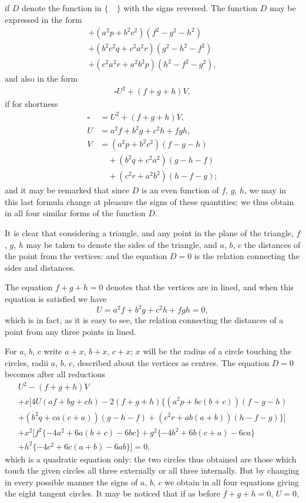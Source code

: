 \documentclass[11pt,a4paper]{book}
\begin{document}
\setcounter{page}{511}

if $D$ denote the function in $\{\quad\}$ with the signs reversed. The function $D$ may be expressed in the form
\begin{multline*}
+ (a^2p + b^2c^2)(f^2 - g^2 - h^2)\\
+ (b^2c^2q + c^2a^2r)(g^2 - h^2 - f^2)\\
+ (c^2a^2r + a^2b^2p)(h^2 - f^2 - g^2),
\end{multline*}
and also in the form
\begin{multline*}
\square U^2 + (f+g+h)V,
\end{multline*}
if for shortness
\begin{align*}
\square &= U^2 + (f+g+h)V,\\
U &= a^2f + b^2g + c^2h + fgh,\\
V &= (a^2p + b^2c^2)(f-g-h)\\
&\quad + (b^2q + c^2a^2)(g-h-f)\\
&\quad + (c^2r + a^2b^2)(h-f-g);
\end{align*}
and it may be remarked that since $D$ is an even function of $f$, $g$, $h$, we may in this last formula change at pleasure the signs of these quantities; we thus obtain in all four similar forms of the function $D$.

It is clear that considering a triangle, and any point in the plane of the triangle, $f$, $g$, $h$ may be taken to denote the sides of the triangle, and $a$, $b$, $c$ the distances of the point from the vertices: and the equation $D = 0$ is the relation connecting the sides and distances.

The equation $f+g+h=0$ denotes that the vertices are in lined, and when this equation is satisfied we have
\[
U = a^2f + b^2g + c^2h + fgh = 0,
\]
which is in fact, as it is easy to see, the relation connecting the distances of a point from any three points in lined.

For $a$, $b$, $c$ write $a+x$, $b+x$, $c+x$; $x$ will be the radius of a circle touching the circles, radii $a$, $b$, $c$, described about the vertices as centres. The equation $D = 0$ becomes after all reductions
\begin{multline*}
U^2 - (f+g+h)V\\
+ x[4U(af+bg+ch) - 2(f+g+h)\{(a^2p+bc(b+c))(f-g-h)\\
+ (b^2q+ca(c+a))(g-h-f) + (c^2r+ab(a+b))(h-f-g)\}]\\
+ x^2[f^2\{-4a^2+6a(b+c)-6bc\} + g^2\{-4b^2+6b(c+a)-6ca\}\\
+ h^2\{-4c^2+6c(a+b)-6ab\}] = 0,
\end{multline*}
which is a quadratic equation only: the two circles thus obtained are those which touch the given circles all three externally or all three internally. But by changing in every possible manner the signs of $a$, $b$, $c$ we obtain in all four equations giving the eight tangent circles. It may be noticed that if as before $f+g+h=0$, $U=0$,
\end{document}
